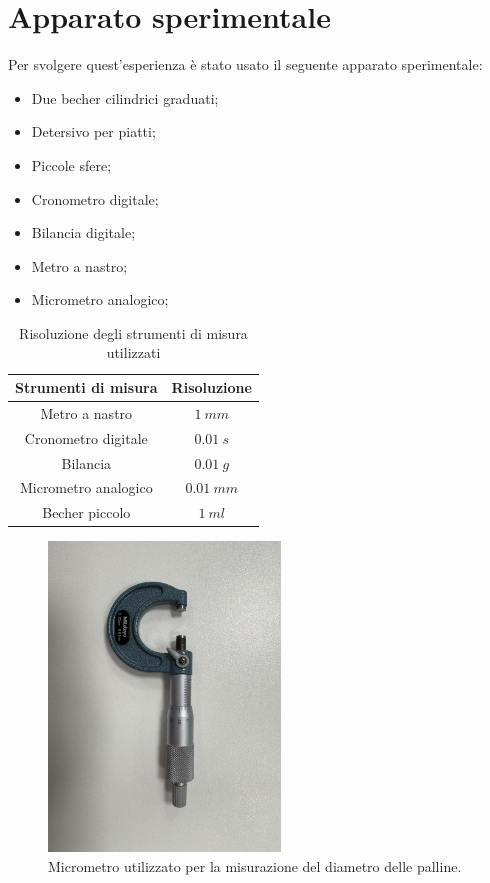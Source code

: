 \documentclass[11pt]{article}
\begin{document}
\section{Apparato sperimentale}
Per svolgere quest'esperienza è stato usato il seguente apparato sperimentale:
\begin{itemize}
    \item Due becher cilindrici graduati;
    \item Detersivo per piatti;
    \item Piccole sfere;
    \item Cronometro digitale;
    \item Bilancia digitale;
    \item Metro a nastro;
    \item Micrometro analogico;
\end{itemize}
\begin{table}[H]
\centering
\begin{tabular}{|c|c|}
\hline
\textbf{Strumenti di misura} & \textbf{Risoluzione} \\
\hline
Metro a nastro & $1\ mm$ \\
Cronometro digitale & $0.01\ s$ \\
Bilancia & $0.01\ g$ \\
Micrometro analogico & $0.01\ mm$ \\
Becher piccolo & $1\ ml$ \\
\hline
\end{tabular}
\caption{Risoluzione degli strumenti di misura utilizzati}
\label{tab:}
\end{table}

\begin{figure}[H]
  \centering
  \includegraphics[width=0.55\textwidth]{micrometro.jpg}
  \caption{Micrometro utilizzato per la misurazione del diametro delle palline.}
\end{figure}
\end{document}
